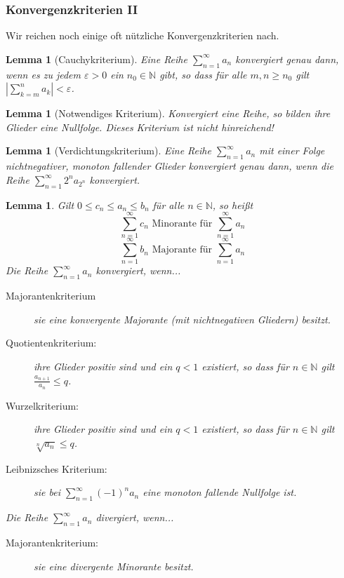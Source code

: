 \documentclass[fontsize=12pt,paper=a4,twoside,bibtotoc,idxtotoc,
liststotoc,pagesize,BCOR1.2cm,DIV15,chapterprefix,pagesize=pdftex]{scrbook}
\theoremstyle{plain}
\newtheorem{lm}[equation]{Lemma}
\theoremstyle{definition}
\theoremstyle{remark}
\begin{document}
\subsubsection{Konvergenzkriterien II}
Wir reichen noch einige oft nützliche Konvergenzkriterien nach.\\
\begin{lm}[Cauchykriterium]
Eine Reihe $\sum_{n=1}^\infty a_n$ konvergiert
                  genau dann, wenn es zu jedem $\varepsilon>0$ ein $n_0
                  \in \mathbb{N}$ gibt, so dass für alle $m,n \geq n_0$
                  gilt $| \sum_{k=m}^n a_k|<\varepsilon$.
\end{lm}
\begin{lm}[Notwendiges Kriterium] Konvergiert eine Reihe, so bilden ihre Glieder eine Nullfolge. Dieses Kriterium ist nicht hinreichend!
\end{lm}
\begin{lm}[Verdichtungskriterium] Eine Reihe $\sum_{n=1}^\infty a_n$ mit
                  einer Folge nichtnegativer, monoton fallender
                  Glieder konvergiert genau dann, wenn die Reihe
                  $\sum_{n=1}^\infty 2^n a_{2^n}$ konvergiert.
\end{lm}
\begin{lm} Gilt $0 \leq c_n \leq a_n \leq b_n$ für alle $n \in \mathbb{N}$, so heißt 
\[\sum_{n=1}^\infty c_n \text{ Minorante für } \sum_{n=1}^\infty a_n\] 
\[\sum_{n=1}^\infty b_n \text{ Majorante für } \sum_{n=1}^\infty a_n\]
Die Reihe $\sum_{n=1}^\infty a_n$ konvergiert, wenn...
\begin{description}
\item[Majorantenkriterium] sie eine konvergente Majorante (mit nichtnegativen Gliedern) besitzt.
\item[Quotientenkriterium:] ihre Glieder positiv sind und ein $q<1$
existiert, so dass für $n \in \mathbb{N}$ gilt $\frac{a_{n+1}}{a_n}
\leq q$. 
\item[Wurzelkriterium:] ihre Glieder positiv sind und ein $q<1$
existiert, so dass für $n \in \mathbb{N}$ gilt $\sqrt[n]{a_n} \leq
q$. 
\item[Leibnizsches Kriterium:] sie bei $\sum_{n=1}^\infty (-1)^n a_n$
eine monoton fallende  Nullfolge ist.
\end{description}
Die Reihe $\sum_{n=1}^\infty a_n$ divergiert, wenn...
\begin{description}
\item[Majorantenkriterium:] sie eine divergente Minorante besitzt.
\end{description}
\end{lm}
\end{document}
